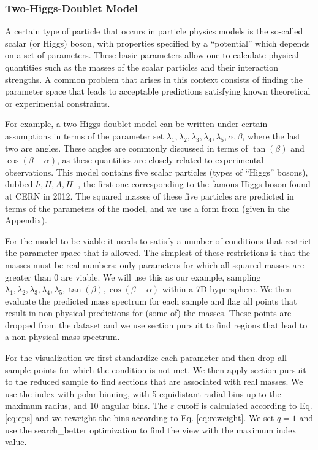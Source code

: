 \documentclass[]{interact}
\theoremstyle{plain}%
\theoremstyle{definition}
\theoremstyle{remark}
\begin{document}
\hypertarget{sec:THDM}{%
\subsubsection*{Two-Higgs-Doublet Model}\label{sec:THDM}}

A certain type of particle that occurs in particle physics models is the
so-called scalar (or Higgs) boson, with properties specified by a
``potential'' which depends on a set of parameters. These basic
parameters allow one to calculate physical quantities such as the masses
of the scalar particles and their interaction strengths. A common
problem that arises in this context consists of finding the parameter
space that leads to acceptable predictions satisfying known theoretical
or experimental constraints.

For example, a two-Higgs-doublet model can be written under certain
assumptions in terms of the parameter set
\(\lambda_1,\lambda_2,\lambda_3,\lambda_4,\lambda_5,\alpha,\beta\),
where the last two are angles. These angles are commonly discussed in
terms of \(\tan(\beta)\) and \(\cos(\beta-\alpha)\), as these quantities
are closely related to experimental observations. This model contains
five scalar particles (types of ``Higgs'' bosons), dubbed
\(h,H,A,H^\pm\), the first one corresponding to the famous Higgs boson
found at CERN in 2012. The squared masses of these five particles are
predicted in terms of the parameters of the model, and we use a form
from \citet{Gunion:2002zf} (given in the Appendix).

For the model to be viable it needs to satisfy a number of conditions
that restrict the parameter space that is allowed. The simplest of these
restrictions is that the masses must be real numbers: only parameters
for which all squared masses are greater than 0 are viable. We will use
this as our example, sampling
\(\lambda_1,\lambda_2,\lambda_3,\lambda_4,\lambda_5,\tan(\beta),\cos(\beta-\alpha)\)
within a 7D hypersphere. We then evaluate the predicted mass spectrum
for each sample and flag all points that result in non-physical
predictions for (some of) the masses. These points are dropped from the
dataset and we use section pursuit to find regions that lead to a
non-physical mass spectrum.

For the visualization we first standardize each parameter and then drop
all sample points for which the condition is not met. We then apply
section pursuit to the reduced sample to find sections that are
associated with real masses. We use the index with polar binning, with 5
equidistant radial bins up to the maximum radius, and 10 angular bins.
The \(\varepsilon\) cutoff is calculated according to Eq. \ref{eq:eps}
and we reweight the bins according to Eq. \ref{eq:reweight}. We set
\(q=1\) and use the search\_better optimization to find the view with
the maximum index value.
\end{document}
